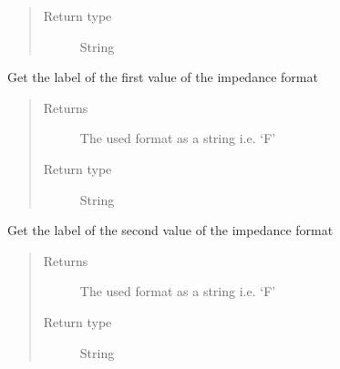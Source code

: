 \documentclass[letterpaper,10pt,english]{sphinxmanual}
\begin{document}
\begin{fulllineitems}
\begin{fulllineitems}
\begin{quote}
\begin{description}
\item[{Return type}] \leavevmode
\sphinxAtStartPar
String

\end{description}\end{quote}

\end{fulllineitems}


\begin{fulllineitems}
\label{\detokenize{index:TiePieLCR_settings.TiePieLCR_settings.get_impedance_format_label1}}
\sphinxAtStartPar
Get the label of the first value of the impedance format
\begin{quote}\begin{description}
\item[{Returns}] \leavevmode
\sphinxAtStartPar
The used format as a string i.e. ‘F’

\item[{Return type}] \leavevmode
\sphinxAtStartPar
String

\end{description}\end{quote}

\end{fulllineitems}


\begin{fulllineitems}
\label{\detokenize{index:TiePieLCR_settings.TiePieLCR_settings.get_impedance_format_label2}}
\sphinxAtStartPar
Get the label of the second value of the impedance format
\begin{quote}\begin{description}
\item[{Returns}] \leavevmode
\sphinxAtStartPar
The used format as a string i.e. ‘F’

\item[{Return type}] \leavevmode
\sphinxAtStartPar
String


\end{description}
\end{quote}
\end{fulllineitems}
\end{fulllineitems}
\end{document}
